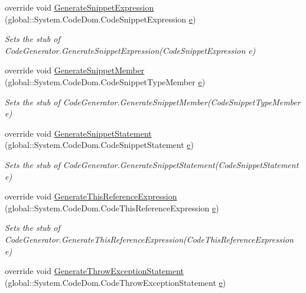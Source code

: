 \begin{DoxyCompactItemize}
override void \hyperlink{class_system_1_1_code_dom_1_1_compiler_1_1_fakes_1_1_stub_code_generator_a2204e39f0f5780a786b7f67ee5441337}{Generate\-Snippet\-Expression} (global\-::\-System.\-Code\-Dom.\-Code\-Snippet\-Expression \hyperlink{jquery-1_810_82_8min_8js_a2c038346d47955cbe2cb91e338edd7e1}{e})
\begin{DoxyCompactList}\small\item\em Sets the stub of Code\-Generator.\-Generate\-Snippet\-Expression(\-Code\-Snippet\-Expression e)\end{DoxyCompactList}\item 
override void \hyperlink{class_system_1_1_code_dom_1_1_compiler_1_1_fakes_1_1_stub_code_generator_a14fa2ed4c930c5273f94b3a8ca35ff39}{Generate\-Snippet\-Member} (global\-::\-System.\-Code\-Dom.\-Code\-Snippet\-Type\-Member \hyperlink{jquery-1_810_82_8min_8js_a2c038346d47955cbe2cb91e338edd7e1}{e})
\begin{DoxyCompactList}\small\item\em Sets the stub of Code\-Generator.\-Generate\-Snippet\-Member(\-Code\-Snippet\-Type\-Member e)\end{DoxyCompactList}\item 
override void \hyperlink{class_system_1_1_code_dom_1_1_compiler_1_1_fakes_1_1_stub_code_generator_a7340dde834dd67fe9b3624d91b4eb8fb}{Generate\-Snippet\-Statement} (global\-::\-System.\-Code\-Dom.\-Code\-Snippet\-Statement \hyperlink{jquery-1_810_82_8min_8js_a2c038346d47955cbe2cb91e338edd7e1}{e})
\begin{DoxyCompactList}\small\item\em Sets the stub of Code\-Generator.\-Generate\-Snippet\-Statement(\-Code\-Snippet\-Statement e)\end{DoxyCompactList}\item 
override void \hyperlink{class_system_1_1_code_dom_1_1_compiler_1_1_fakes_1_1_stub_code_generator_a593651dec89608de01d43dd2c486f978}{Generate\-This\-Reference\-Expression} (global\-::\-System.\-Code\-Dom.\-Code\-This\-Reference\-Expression \hyperlink{jquery-1_810_82_8min_8js_a2c038346d47955cbe2cb91e338edd7e1}{e})
\begin{DoxyCompactList}\small\item\em Sets the stub of Code\-Generator.\-Generate\-This\-Reference\-Expression(\-Code\-This\-Reference\-Expression e)\end{DoxyCompactList}\item 
override void \hyperlink{class_system_1_1_code_dom_1_1_compiler_1_1_fakes_1_1_stub_code_generator_a73f8860b48dfe269a89dd4defa269be9}{Generate\-Throw\-Exception\-Statement} (global\-::\-System.\-Code\-Dom.\-Code\-Throw\-Exception\-Statement \hyperlink{jquery-1_810_82_8min_8js_a2c038346d47955cbe2cb91e338edd7e1}{e})

\end{DoxyCompactItemize}
